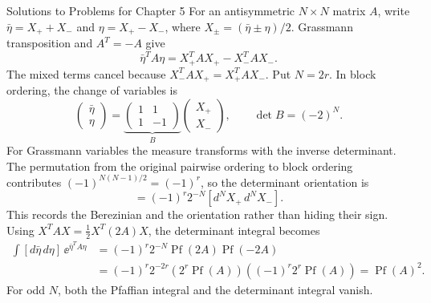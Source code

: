 \begin{bankssolutions}{Solutions to Problems for Chapter 5}
For an antisymmetric $N\times N$ matrix $A$, write
$\bar\eta=X_++X_-$ and $\eta=X_+-X_-$, where
$X_\pm=(\bar\eta\pm\eta)/2$. Grassmann transposition and $A^T=-A$ give
\begin{equation*}
 \bar\eta^TA\eta=X_+^TAX_+-X_-^TAX_-.
\end{equation*}
The mixed terms cancel because
$X_-^TAX_+=X_+^TAX_-$. Put $N=2r$. In block ordering, the change of
variables is
\begin{equation*}
 \begin{pmatrix}\bar\eta\\ \eta\end{pmatrix}
 =
 \underbrace{\begin{pmatrix}1&1\\1&-1\end{pmatrix}}_{B}
 \begin{pmatrix}X_+\\X_-\end{pmatrix},
 \qquad \det B=(-2)^N.
\end{equation*}
For Grassmann variables the measure transforms with the inverse determinant.
The permutation from the original pairwise ordering to block ordering contributes
$(-1)^{N(N-1)/2}=(-1)^r$, so the determinant orientation is
\begin{equation*}
 [d^N\bar\eta\,d^N\eta]
 =(-1)^r2^{-N}[d^NX_+\,d^NX_-].
\end{equation*}
This records the Berezinian and the orientation rather than hiding their sign.
Using $X^TAX=\frac12X^T(2A)X$, the determinant integral becomes
\begin{align*}
 \int[d\bar\eta\,d\eta]\,\ee^{\bar\eta^TA\eta}
 &=(-1)^r2^{-N}\operatorname{Pf}(2A)\operatorname{Pf}(-2A)\\
 &=(-1)^r2^{-2r}\left(2^r\operatorname{Pf}(A)\right)
       \left((-1)^r2^r\operatorname{Pf}(A)\right)
 =\operatorname{Pf}(A)^2.
\end{align*}
For odd $N$, both the Pfaffian integral and the determinant integral vanish.


\end{bankssolutions}
